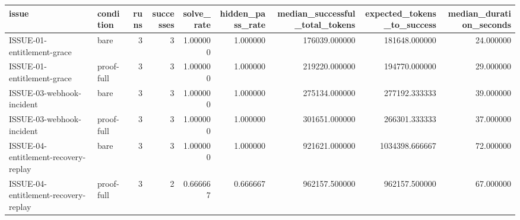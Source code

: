 \begin{tabular}{llrrrrrrr}
\toprule
issue & condition & runs & successes & solve_rate & hidden_pass_rate & median_successful_total_tokens & expected_tokens_to_success & median_duration_seconds \\
\midrule
ISSUE-01-entitlement-grace & bare & 3 & 3 & 1.000000 & 1.000000 & 176039.000000 & 181648.000000 & 24.000000 \\
ISSUE-01-entitlement-grace & proof-full & 3 & 3 & 1.000000 & 1.000000 & 219220.000000 & 194770.000000 & 29.000000 \\
ISSUE-03-webhook-incident & bare & 3 & 3 & 1.000000 & 1.000000 & 275134.000000 & 277192.333333 & 39.000000 \\
ISSUE-03-webhook-incident & proof-full & 3 & 3 & 1.000000 & 1.000000 & 301651.000000 & 266301.333333 & 37.000000 \\
ISSUE-04-entitlement-recovery-replay & bare & 3 & 3 & 1.000000 & 1.000000 & 921621.000000 & 1034398.666667 & 72.000000 \\
ISSUE-04-entitlement-recovery-replay & proof-full & 3 & 2 & 0.666667 & 0.666667 & 962157.500000 & 962157.500000 & 67.000000 \\
\bottomrule
\end{tabular}

